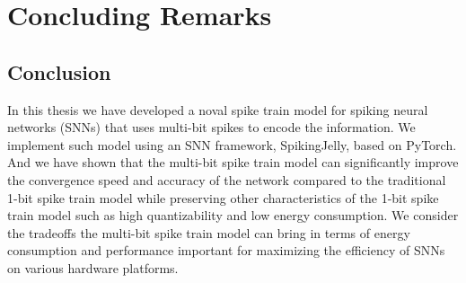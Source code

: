 \chapter{Concluding Remarks}
\label{chap:concluding_remarks}

    \section{Conclusion}
    \label{sec:conclusion}
        In this thesis we have developed a noval spike train model for spiking neural networks (SNNs) that uses multi-bit spikes to encode the information. We implement such model using an SNN framework, SpikingJelly, based on PyTorch. And we have shown that the multi-bit spike train model can significantly improve the convergence speed and accuracy of the network compared to the traditional 1-bit spike train model while preserving other characteristics of the 1-bit spike train model such as high quantizability and low energy consumption. We consider the tradeoffs the multi-bit spike train model can bring in terms of energy consumption and performance important for maximizing the efficiency of SNNs on various hardware platforms.

